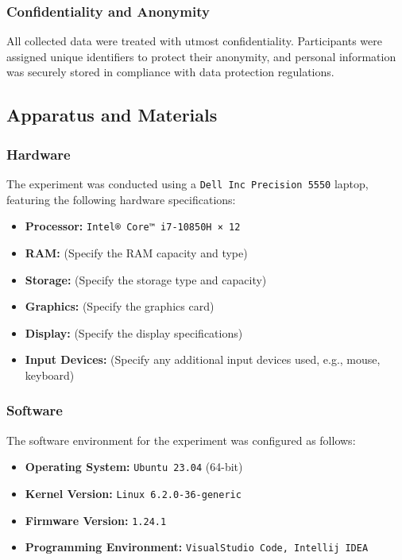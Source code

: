 \documentclass{article}
\begin{document}
\subsubsection*{Confidentiality and Anonymity}

All collected data were treated with utmost confidentiality. Participants were assigned unique identifiers to protect their anonymity, and personal information was securely stored in compliance with data protection regulations.

\subsection{Apparatus and Materials}


\subsubsection*{Hardware}
The experiment was conducted using a \texttt{Dell Inc Precision 5550} laptop, featuring the following hardware specifications:
\begin{itemize}
  \item \textbf{Processor:} \texttt{Intel® Core™ i7-10850H × 12}
  \item \textbf{RAM:} (Specify the RAM capacity and type)
  \item \textbf{Storage:} (Specify the storage type and capacity)
  \item \textbf{Graphics:} (Specify the graphics card)
  \item \textbf{Display:} (Specify the display specifications)
  \item \textbf{Input Devices:} (Specify any additional input devices used, e.g., mouse, keyboard)
\end{itemize}

\subsubsection*{Software}
The software environment for the experiment was configured as follows:
\begin{itemize}
  \item \textbf{Operating System:} \texttt{Ubuntu 23.04} (64-bit)
  \item \textbf{Kernel Version:} \texttt{Linux 6.2.0-36-generic}
  \item \textbf{Firmware Version:} \texttt{1.24.1}
  \item \textbf{Programming Environment:} \texttt{VisualStudio Code, Intellij IDEA}
\end{itemize}
\end{document}
